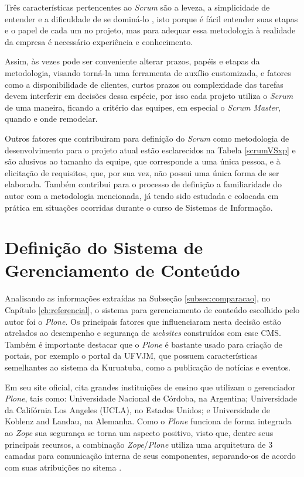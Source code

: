 Três características pertencentes ao \textit{Scrum} são a leveza, a simplicidade de entender e a dificuldade de se dominá-lo , isto porque é fácil entender suas etapas e o papel de cada um no projeto, mas para adequar essa metodologia à realidade da empresa é necessário experiência e conhecimento.

Assim, às vezes pode ser conveniente alterar prazos, papéis e etapas da metodologia, visando torná-la uma ferramenta de auxílio customizada, e fatores como a disponibilidade de clientes, curtos prazos ou complexidade das tarefas devem interferir em decisões dessa espécie, por isso cada projeto utiliza o \textit{Scrum} de uma maneira, ficando a critério das equipes, em especial o \textit{Scrum Master}, quando e onde remodelar.

Outros fatores que contribuiram para definição do \textit{Scrum} como metodologia de desenvolvimento para o projeto atual estão esclarecidos na Tabela \ref{scrumVSxp} e são alusivos ao tamanho da equipe, que corresponde a uma única pessoa, e à elicitação de requisitos, que, por sua vez, não possui uma única forma de ser elaborada. Também contribui para o processo de definição a familiaridade do autor com a metodologia mencionada, já tendo sido estudada e colocada em prática em situações ocorridas durante o curso de Sistemas de Informação.


\hspace{2.5cm}
\section{Definição do Sistema de Gerenciamento de Conteúdo}
\label{sec:defCMS}

\hspace{2.5cm}

Analisando as informações extraídas na Subseção \ref{subsec:comparacao}, no Capítulo \ref{ch:referencial}, o sistema para gerenciamento de conteúdo escolhido pelo autor foi o \textit{Plone}. Os principais fatores que influenciaram nesta decisão estão atrelados ao desempenho e segurança de \textit{websites} construídos com esse CMS. Também é importante destacar que o \textit{Plone} é bastante usado para criação de portais, por exemplo o portal da UFVJM, que possuem características semelhantes ao sistema da Kuruatuba, como a publicação de notícias e eventos. 

Em seu site oficial,  cita grandes instituições de ensino que utilizam o gerenciador \textit{Plone}, tais como: Universidade Nacional de Córdoba, na Argentina; Universidade da Califórnia Los Angeles (UCLA), no Estados Unidos; e Universidade de Koblenz and Landau, na Alemanha. Como o \textit{Plone} funciona de forma integrada ao \textit{Zope} sua segurança se torna um aspecto positivo, visto que, dentre seus principais recursos, a combinação \textit{Zope}/\textit{Plone} utiliza uma arquitetura de 3 camadas para comunicação interna de seus componentes, separando-os de acordo com suas atribuições no sitema \cite{pastore}. 

